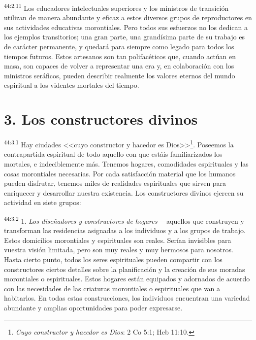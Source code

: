 \par
\textsuperscript{44:2.11} Los educadores intelectuales superiores y los ministros de transición utilizan de manera abundante y eficaz a estos diversos grupos de reproductores en sus actividades educativas morontiales. Pero todos sus esfuerzos no los dedican a los ejemplos transitorios; una gran parte, una grandísima parte de su trabajo es de carácter permanente, y quedará para siempre como legado para todos los tiempos futuros. Estos artesanos son tan polifacéticos que, cuando actúan en masa, son capaces de volver a representar una era y, en colaboración con los ministros seráficos, pueden describir realmente los valores eternos del mundo espiritual a los videntes mortales del tiempo.

\section*{3. Los constructores divinos}
\par
\textsuperscript{44:3.1} Hay ciudades <<cuyo constructor y hacedor es Dios>>\footnote{\textit{Cuyo constructor y hacedor es Dios}: 2 Co 5:1; Heb 11:10.}. Poseemos la contrapartida espiritual de todo aquello con que estáis familiarizados los mortales, e indeciblemente más. Tenemos hogares, comodidades espirituales y las cosas morontiales necesarias. Por cada satisfacción material que los humanos pueden disfrutar, tenemos miles de realidades espirituales que sirven para enriquecer y desarrollar nuestra existencia. Los constructores divinos ejercen su actividad en siete grupos:

\par
\textsuperscript{44:3.2} 1. \textit{Los diseñadores y constructores de hogares} ---aquellos que construyen y transforman las residencias asignadas a los individuos y a los grupos de trabajo. Estos domicilios morontiales y espirituales son reales. Serían invisibles para vuestra visión limitada, pero son muy reales y muy hermosos para nosotros. Hasta cierto punto, todos los seres espirituales pueden compartir con los constructores ciertos detalles sobre la planificación y la creación de sus moradas morontiales o espirituales. Estos hogares están equipados y adornados de acuerdo con las necesidades de las criaturas morontiales o espirituales que van a habitarlos. En todas estas construcciones, los individuos encuentran una variedad abundante y amplias oportunidades para poder expresarse.


